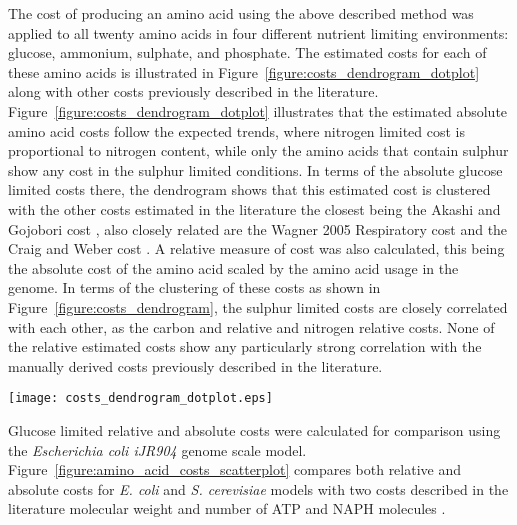 The cost of producing an amino acid using the above described method was applied to all twenty amino acids in four different nutrient limiting environments: glucose, ammonium, sulphate, and phosphate. The estimated costs for each of these amino acids is illustrated in Figure~\vref{figure:costs_dendrogram_dotplot} along with other costs previously described in the literature. Figure~\ref{figure:costs_dendrogram_dotplot} illustrates that the estimated absolute amino acid costs follow the expected trends, where nitrogen limited cost is proportional to nitrogen content, while only the amino acids that contain sulphur show any cost in the sulphur limited conditions. In terms of the absolute glucose limited costs there, the dendrogram shows that this estimated cost is clustered with the other costs estimated in the literature the closest being the Akashi and Gojobori cost \cite{akashi2002}, also closely related are the Wagner 2005 Respiratory cost \cite{wagner2005} and the Craig and Weber cost \cite{craig1998}. A relative measure of cost was also calculated, this being the absolute cost of the amino acid scaled by the amino acid usage in the genome. In terms of the clustering of these costs as shown in Figure~\ref{figure:costs_dendrogram}, the sulphur limited costs are closely correlated with each other, as the carbon and relative and nitrogen relative costs. None of the relative estimated costs show any particularly strong correlation with the manually derived costs previously described in the literature.

\begin{sidewaysfigure}
\centering
\texttt{[image: costs\_dendrogram\_dotplot.eps]}
\caption[Comparison of amino acid cost estimates]{Amino acid cost estimates are shown as bar charts on the left hand side. Each bar chart axis shows the minimum and maximum value of each cost type, rounded to three significant figures. The correlations between costs are compared in a dendrogram on the right hand side computed by complete agglomerative clustering using Spearman's Rank correlation distance between data sets. The illustrated data is shown in Appendix Table~\vref{appendix:table:amino_acid_costs}}
\label{figure:costs_dendrogram_dotplot}
\end{sidewaysfigure}

Glucose limited relative and absolute costs were calculated for comparison using the \emph{Escherichia coli iJR904} genome scale model. Figure~\vref{figure:amino_acid_costs_scatterplot} compares both relative and absolute costs for \emph{E. coli} and \emph{S. cerevisiae} models with two costs described in the literature molecular weight \cite{seligmann2004} and number of ATP and NAPH molecules \cite{akashi2002}.


